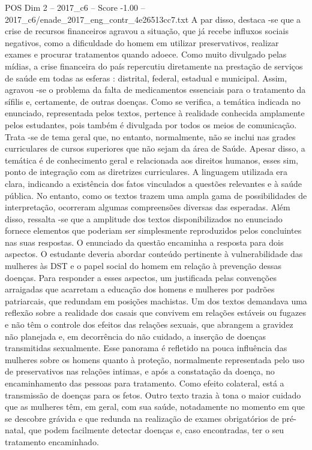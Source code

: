 \begin{textsample}{POS Dim 2 – 2017\_c6 – Score -1.00 – 2017\_c6/enade\_2017\_eng\_contr\_4e26513cc7.txt}
A par disso, destaca -se que a crise de recursos financeiros agravou a situação, que já recebe influxos sociais negativos, como a dificuldade do homem em utilizar preservativos, realizar exames e procurar tratamentos quando adoece.
Como muito divulgado pelas mídias, a crise financeira do país repercutiu diretamente na prestação de serviços de saúde em todas as esferas : distrital, federal, estadual e municipal.
Assim, agravou -se o problema da falta de medicamentos essenciais para o tratamento da sífilis e, certamente, de outras doenças.
Como se verifica, a temática indicada no enunciado, representada pelos textos, pertence à realidade conhecida amplamente pelos estudantes, pois também é divulgada por todos os meios de comunicação.
Trata -se de tema geral que, no entanto, normalmente, não se inclui nas grades curriculares de cursos superiores que não sejam da área de Saúde.
Apesar disso, a temática é de conhecimento geral e relacionada aos direitos humanos, esses sim, ponto de integração com as diretrizes curriculares.
A linguagem utilizada era clara, indicando a existência dos fatos vinculados a questões relevantes e à saúde pública.
No entanto, como os textos trazem uma ampla gama de possibilidades de interpretação, ocorreram algumas compreensões diversas das esperadas.
Além disso, ressalta -se que a amplitude dos textos disponibilizados no enunciado fornece elementos que poderiam ser simplesmente reproduzidos pelos concluintes nas suas respostas.
O enunciado da questão encaminha a resposta para dois aspectos.
O estudante deveria abordar conteúdo pertinente à vulnerabilidade das mulheres às DST e o papel social do homem em relação à prevenção dessas doenças.
Para responder a esses aspectos, um justificada pelas convenções arraigadas que acarretam a educação dos homens e mulheres por padrões patriarcais, que redundam em posições machistas.
Um dos textos demandava uma reflexão sobre a realidade dos casais que convivem em relações estáveis ou fugazes e não têm o controle dos efeitos das relações sexuais, que abrangem a gravidez não planejada e, em decorrência do não cuidado, a inserção de doenças transmitidas sexualmente.
Esse panorama é refletido na pouca influência das mulheres sobre os homens quanto à proteção, normalmente representada pelo uso de preservativos nas relações intimas, e após a constatação da doença, no encaminhamento das pessoas para tratamento.
Como efeito colateral, está a transmissão de doenças para os fetos.
Outro texto trazia à tona o maior cuidado que as mulheres têm, em geral, com sua saúde, notadamente no momento em que se descobre grávida e que redunda na realização de exames obrigatórios de pré-natal, que podem facilmente detectar doenças e, caso encontradas, ter o seu tratamento encaminhado.

\end{textsample}
